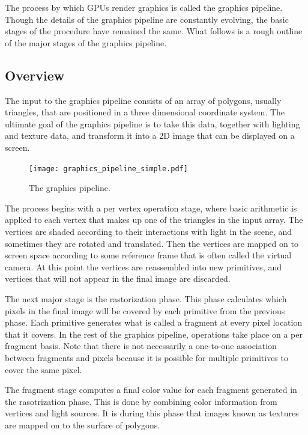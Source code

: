 \documentclass[12pt,twoside]{reedthesis}
\begin{document}
The process by which GPUs render graphics is called the graphics pipeline. Though the details of the graphics pipeline are constantly evolving, the basic stages of the procedure have remained the same. What follows is a rough outline of the major stages of the graphics pipeline.

\subsection{Overview}

The input to the graphics pipeline consists of an array of polygons, usually triangles, that are positioned in a three dimensional coordinate system. The ultimate goal of the graphics pipeline is to take this data, together with lighting and texture data, and transform it into a 2D image that can be displayed on a screen.

\begin{figure}[h]
\texttt{[image: graphics\_pipeline\_simple.pdf]}
\caption{The graphics pipeline.}
\end{figure}
\vspace{1pc}

The process begins with a per vertex operation stage, where basic arithmetic is applied to each vertex that makes up one of the triangles in the input array. The vertices are shaded according to their interactions with light in the scene, and sometimes they are rotated and translated. Then the vertices are mapped on to screen space according to some reference frame that is often called the virtual camera.  At this point the vertices are reassembled into new primitives, and vertices that will not appear in the final image are discarded.

The next major stage is the rastorization phase. This phase calculates which pixels in the final image will be covered by each primitive from the previous phase. Each primitive generates what is called a fragment at every pixel location that it covers. In the rest of the graphics pipeline, operations take place on a per fragment basis. Note that there is not necessarily a one-to-one association between fragments and pixels because it is possible for multiple primitives to cover the same pixel.

The fragment stage computes a final color value for each fragment generated in the rasotrization phase. This is done by combining color information from vertices and light sources. It is during this phase that images known as textures are mapped on to the surface of polygons.
\end{document}

